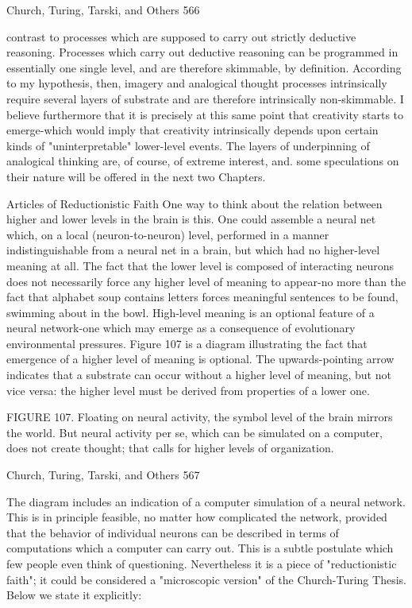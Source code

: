 {Church, Turing, Tarski, and Others                                                      566

contrast to processes which are supposed to carry out strictly deductive reasoning.
Processes which carry out deductive reasoning can be programmed in essentially one
single level, and are therefore skimmable, by definition. According to my hypothesis,
then, imagery and analogical thought processes intrinsically require several layers of
substrate and are therefore intrinsically non-skimmable. I believe furthermore that it is
precisely at this same point that creativity starts to emerge-which would imply that
creativity intrinsically depends upon certain kinds of "uninterpretable" lower-level
events. The layers of underpinning of analogical thinking are, of course, of extreme
interest, and. some speculations on their nature will be offered in the next two Chapters.

                         Articles of Reductionistic Faith
One way to think about the relation between higher and lower levels in the brain is this.
One could assemble a neural net which, on a local (neuron-to-neuron) level, performed in
a manner indistinguishable from a neural net in a brain, but which had no higher-level
meaning at all. The fact that the lower level is composed of interacting neurons does not
necessarily force any higher level of meaning to appear-no more than the fact that
alphabet soup contains letters forces meaningful sentences to be found, swimming about
in the bowl. High-level meaning is an optional feature of a neural network-one which
may emerge as a consequence of evolutionary environmental pressures.
       Figure 107 is a diagram illustrating the fact that emergence of a higher level of
meaning is optional. The upwards-pointing arrow indicates that a substrate can occur
without a higher level of meaning, but not vice versa: the higher level must be derived
from properties of a lower one.

FIGURE 107. Floating on neural activity, the symbol level of the brain mirrors the
world. But neural activity per se, which can be simulated on a computer, does not create
thought; that calls for higher levels of organization.




Church, Turing, Tarski, and Others                                                    567

The diagram includes an indication of a computer simulation of a neural network. This is
in principle feasible, no matter how complicated the network, provided that the behavior
of individual neurons can be described in terms of computations which a computer can
carry out. This is a subtle postulate which few people even think of questioning.
Nevertheless it is a piece of "reductionistic faith"; it could be considered a "microscopic
version" of the Church-Turing Thesis. Below we state it explicitly:

}
